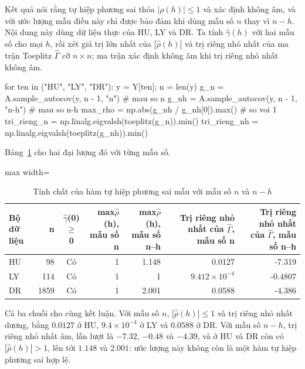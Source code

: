  Kết quả  nói rằng tự hiệp phương sai thỏa $|\rho(h)|\le1$ và xác định không âm, và với ước lượng mẫu điều này chỉ được bảo đảm khi dùng mẫu số $n$ thay vì $n-h$.
 Nội dung này dùng dữ liệu thực của HU, LY và DR. Ta tính $\hat\gamma(h)$ với hai mẫu số cho mọi $h$, rồi xét giá trị lớn nhất của $|\hat\rho(h)|$ và trị riêng nhỏ nhất của ma trận Toeplitz $\hat\Gamma$ cỡ $n\times n$; ma trận xác định không âm khi trị riêng nhỏ nhất không âm.
\begin{codeblock}
for ten in ("HU", "LY", "DR"):
    y = Y[ten]; n = len(y)
    g_n = A.sample_autocov(y, n - 1, "n")          # mau so n
    g_nh = A.sample_autocov(y, n - 1, "n-h")       # mau so n-h
    max_rho = np.abs(g_nh / g_nh[0]).max()         # so voi 1
    tri_rieng_n = np.linalg.eigvalsh(toeplitz(g_n)).min()
    tri_rieng_nh = np.linalg.eigvalsh(toeplitz(g_nh)).min()
\end{codeblock}
 Bảng~\ref{tab:tab_b11_02_gamma_properties} cho hai đại lượng đó với từng mẫu số.
\begin{table}[H]
\centering\footnotesize
\caption{Tính chất của hàm tự hiệp phương sai mẫu với mẫu số $n$ và $n-h$}\label{tab:tab_b11_02_gamma_properties}
\begin{adjustbox}{max width=\linewidth}
\begin{tabular}{|l|r|c|r|r|r|r|}
\toprule
Bộ dữ liệu & n & $\hat{\gamma}$(0) $\ge$ 0 & max\textbar{}$\hat{\rho}$(h)\textbar{}, mẫu số n & max\textbar{}$\hat{\rho}$(h)\textbar{}, mẫu số n–h & Trị riêng nhỏ nhất của $\hat{\Gamma}$, mẫu số n & Trị riêng nhỏ nhất của $\hat{\Gamma}$, mẫu số n–h \\
\midrule
HU & 98 & Có & 1 & 1.148 & 0.0127 & -7.319 \\
LY & 114 & Có & 1 & 1 & $9.412\times10^{-4}$ & -0.4807 \\
DR & 1859 & Có & 1 & 2.001 & 0.0588 & -4.386 \\
\bottomrule
\end{tabular}
\end{adjustbox}\par{}
\end{table}
 Cả ba chuỗi cho cùng kết luận. Với mẫu số $n$, $|\hat\rho(h)|\le1$ và trị riêng nhỏ nhất dương, bằng $0.0127$ ở HU, $9.4\times10^{-4}$ ở LY và $0.0588$ ở DR. Với mẫu số $n-h$, trị riêng nhỏ nhất âm, lần lượt là $-7.32$, $-0.48$ và $-4.39$, và ở HU và DR còn có $|\hat\rho(h)|>1$, lên tới $1.148$ và $2.001$: ước lượng này không còn là một hàm tự hiệp phương sai hợp lệ.

